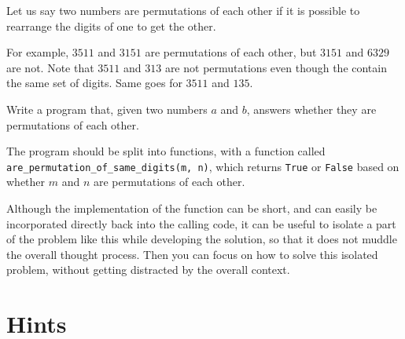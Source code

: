 
Let us say two numbers are permutations of each other if it is possible to rearrange the digits of one to get the other.

For example, $3511$ and $3151$ are permutations of each other, but $3151$ and $6329$ are not.
Note that $3511$ and $313$ are not permutations even though the contain the same set of digits.
Same goes for $3511$ and $135$.

Write a program that, given two numbers $a$ and $b$,
answers whether they are permutations of each other.

The program should be split into functions,
with a function called \texttt{are\_permutation\_of\_same\_digits(m, n)},
which returns \texttt{True} or \texttt{False}
based on whether $m$ and $n$ are permutations of each other.

Although the implementation of the function can be short,
and can easily be incorporated directly back into the calling code,
it can be useful to isolate a part of the problem like this while developing the solution,
so that it does not muddle the overall thought process.
Then you can focus on how to solve this isolated problem,
without getting distracted by the overall context.

\section*{Hints}

